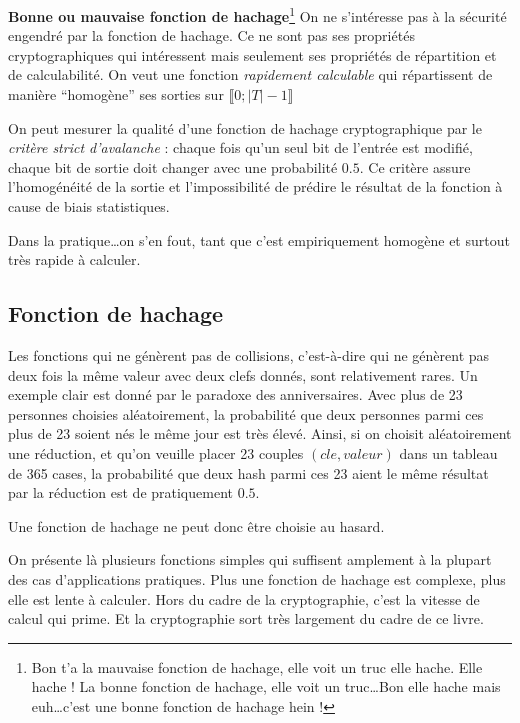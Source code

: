 \documentclass[../../../main.tex]{subfiles}
\begin{document}
\begin{minitelbasicbox}{\textbf{Bonne ou mauvaise fonction de hachage}\footnote{Bon t'a la mauvaise fonction de hachage, elle voit un truc elle hache. Elle hache ! La bonne fonction de hachage, elle voit un truc\dots Bon elle hache mais euh\dots c'est une bonne fonction de hachage hein !}}
On ne s'intéresse pas à la sécurité engendré par la fonction de hachage. Ce ne sont pas ses propriétés cryptographiques qui intéressent mais seulement ses propriétés de répartition et de calculabilité. On veut une fonction \textit{rapidement calculable} qui répartissent de manière ``homogène'' ses sorties sur $\llbracket 0; |T| - 1\rrbracket$ \newline

On peut mesurer la qualité d'une fonction de hachage cryptographique par le \textit{critère strict d'avalanche} : chaque fois qu'un seul bit de l'entrée est modifié, chaque bit de sortie doit changer avec une probabilité $0.5$. Ce critère assure l'homogénéité de la sortie et l'impossibilité de prédire le résultat de la fonction à cause de biais statistiques.

Dans la pratique\dots on s'en fout, tant que c'est empiriquement homogène et surtout très rapide à calculer.
\end{minitelbasicbox}
\subsection{Fonction de hachage}
Les fonctions qui ne génèrent pas de collisions, c'est-à-dire qui ne génèrent pas deux fois la même valeur avec deux clefs donnés, sont relativement rares. Un exemple clair est donné par le paradoxe des anniversaires. Avec plus de 23 personnes choisies aléatoirement, la probabilité que deux personnes parmi ces plus de 23 soient nés le même jour est très élevé. Ainsi, si on choisit aléatoirement une réduction, et qu'on veuille placer 23 couples $(cle, valeur)$ dans un tableau de 365 cases, la probabilité que deux hash parmi ces 23 aient le même résultat par la réduction est de pratiquement $0.5$.

Une fonction de hachage ne peut donc être choisie au hasard.

On présente là plusieurs fonctions simples qui suffisent amplement à la plupart des cas d'applications pratiques. Plus une fonction de hachage est complexe, plus elle est lente à calculer. Hors du cadre de la cryptographie, c'est la vitesse de calcul qui prime. Et la cryptographie sort très largement du cadre de ce livre.
\end{document}
